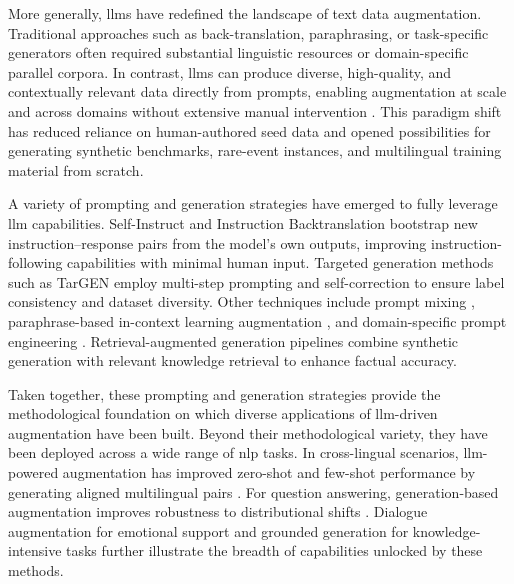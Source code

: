 More generally, \glspl{llm} have redefined the landscape of text data augmentation. Traditional approaches such as back-translation, paraphrasing, or task-specific generators often required substantial linguistic resources or domain-specific parallel corpora. In contrast, \glspl{llm} can produce diverse, high-quality, and contextually relevant data directly from prompts, enabling augmentation at scale and across domains without extensive manual intervention \citep{wangSelfInstructAligningLanguage2023,liSelfAlignmentInstructionBacktranslation2023,guptaTarGENTargetedData2024}. This paradigm shift has reduced reliance on human-authored seed data and opened possibilities for generating synthetic benchmarks, rare-event instances, and multilingual training material from scratch.

A variety of prompting and generation strategies have emerged to fully leverage \gls{llm} capabilities. Self-Instruct \citep{wangSelfInstructAligningLanguage2023} and Instruction Backtranslation \citep{liSelfAlignmentInstructionBacktranslation2023} bootstrap new instruction–response pairs from the model’s own outputs, improving instruction-following capabilities with minimal human input. Targeted generation methods such as TarGEN \citep{guptaTarGENTargetedData2024} employ multi-step prompting and self-correction to ensure label consistency and dataset diversity. Other techniques include prompt mixing \citep{schlegel2023promptmix}, paraphrase-based in-context learning augmentation \citep{li2023dail}, and domain-specific prompt engineering \citep{sahu2022intent_llm_offtheshelf}. Retrieval-augmented generation pipelines \citep{gao2024rag_survey,bonifacio2022inpars,saad-falcon2023udapdr} combine synthetic generation with relevant knowledge retrieval to enhance factual accuracy.

Taken together, these prompting and generation strategies provide the methodological foundation on which diverse applications of \gls{llm}-driven augmentation have been built. Beyond their methodological variety, they have been deployed across a wide range of \gls{nlp} tasks. In cross-lingual scenarios, \gls{llm}-powered augmentation has improved zero-shot and few-shot performance by generating aligned multilingual pairs \citep{whitehouse2023llm_xling_aug,zhang2024llm_dep_parse_dialogue_cn}. For question answering, generation-based augmentation improves robustness to distributional shifts \citep{samuel2024lowres_rc,chowdhury2024qa_robustness_da}. Dialogue augmentation for emotional support \citep{augesc2023acl_findings} and grounded generation for knowledge-intensive tasks \citep{wu2021controllable_grounded_dialogue} further illustrate the breadth of capabilities unlocked by these methods.

